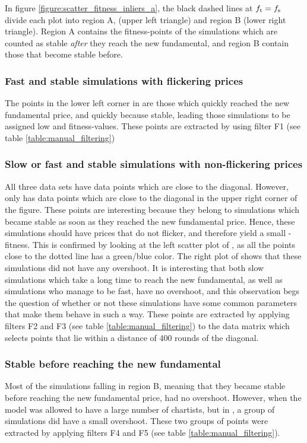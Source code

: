 In figure \ref{figure:scatter_fitness_inliers_a}, the black dashed lines at $f_\text{t} = f_\text{s}$ divide each plot into region A, (upper left triangle) and region B (lower right triangle). Region A contains the fitness-points of the simulations which are counted as stable \textit{after} they reach the new fundamental, and region B contain those that become stable before. 

\subsubsection*{Fast and stable simulations with flickering prices}
The points in the lower left corner in are those which quickly reached the new fundamental price, and quickly because stable, leading those simulations to be assigned low \timetoreachnewfundamental and \roundstable fitness-values. These points are extracted by using filter F1 (see table \ref{table:manual_filtering})

\subsubsection*{Slow or fast and stable simulations with non-flickering prices}
All three data sets have data points which are close to the diagonal. However, only \dnine{} has data points which are close to the diagonal in the upper right corner of the figure. These points are interesting because they belong to simulations which became stable as soon as they reached the new fundamental price. Hence, these simulations should have prices that do not flicker, and therefore yield a small \stdev-fitness. This is confirmed by looking at the left scatter plot of \dnine, as all the points close to the dotted line has a green/blue color. The right plot of \dnine{} shows that these simulations did not have any overshoot. It is interesting that both slow simulations which take a long time to reach the new fundamental, as well as simulations who manage to be fast, have no overshoot, and this observation begs the question of whether or not these simulations have some common parameters that make them behave in such a way. These points are extracted by applying filters F2 and F3 (see table \ref{table:manual_filtering}) to the data matrix \datamatrixfit{\dnine} which selects points that lie within a distance of 400 rounds of the diagonal. 


\subsubsection*{Stable before reaching the new fundamental}
Most of the simulations falling in region B, meaning that they became stable before reaching the new fundamental price, had no overshoot. However, when the model was allowed to have a large number of chartists, but in \deleven, a group of simulations did have a small overshoot. These two groups of points were extracted by applying filters F4 and F5  (see table \ref{table:manual_filtering}).

